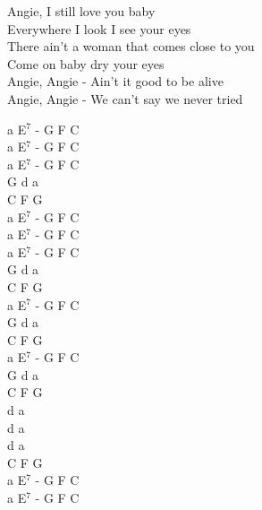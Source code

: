 \documentclass[a5paper, 10pt]{book}
\begin{document}
\begin{minipage}[t]{0.8\textwidth}
\hspace*{3mm} Angie, I still love you baby\\
\hspace*{3mm} Everywhere I look I see your eyes\\
\hspace*{3mm} There ain't a woman that comes close to you\\
\hspace*{3mm} Come on baby dry your eyes\\

Angie, Angie - Ain't it good to be alive\\
Angie, Angie - We can't say we never tried\\

\end{minipage}
\begin{minipage}[t]{0.2\textwidth}
a E$^7$ - G F C \\
a E$^7$ - G F C \\
a E$^7$ - G F C \\

G d a\\
C F G\\

a E$^7$ - G F C \\

a E$^7$ - G F C \\
a E$^7$ - G F C \\

G d a\\
C F G\\

a E$^7$ - G F C \\

G d a\\
C F G\\

a E$^7$ - G F C \\

G d a\\
C F G\\

d a\\
d a\\
d a\\
C F G\\

a E$^7$ - G F C \\
a E$^7$ - G F C \\

\end{minipage}
\end{document}
